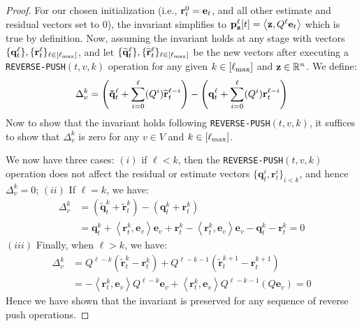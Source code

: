 \begin{proof}
For our chosen initialization (i.e., $\mathbf{r}^{0}_t = \mathbf{e}_t$, and all other estimate and residual vectors set to $0$), the invariant simplifies to $\mathbf{p}_\mathbf{z}^{\ell}[t] = \left< \mathbf{z} , Q^{\ell}\mathbf{e}_t \right>$ which is true by definition.
Now, assuming the invariant holds at any stage with vectors $\{\mathbf{q}^{\ell}_t\}, \{\mathbf{r}^{\ell}_t\}_{\ell\in[\ell_{\max}]}$, and let $\{\widetilde{\mathbf{q}}^{\ell}_t\}, \{\widetilde{\mathbf{r}}^{\ell}_t\}_{\ell\in[\ell_{\max}]}$ be the new vectors after executing a \texttt{REVERSE-PUSH}$(t,v,k)$ operation for any given $k\in[\ell_{\max}]$ and $\mathbf{z}\in\mathbb{R}^n$. We define:
$$\Delta_v^{k} = \left( \mathbf{\tilde{q}}_t^{\ell} + \sum_{i=0}^{\ell}  (Q^i)\widetilde{\mathbf{r}}^{\ell-i}_t \right)- \left( \mathbf{q}^{\ell}_t + \sum_{i=0}^{\ell}  (Q^i) \mathbf{r}_t^{\ell-i}\right)$$
Now to show that the invariant holds following \texttt{REVERSE-PUSH}$(t,v,k)$, it suffices to show that $\Delta_v^{k}$ is zero for any $v\in V$ and $k\in[\ell_{\max}]$. 

We now have three cases: $(i)$ if $\ell < k$, then the \texttt{REVERSE-PUSH}$(t,v,k)$ operation does not affect the residual or estimate vectors $\{\mathbf{q}_t^{i},\mathbf{r}_t^{i}\}_{i<k}$, and hence 
$\Delta_v^k=0$;
$(ii)$ If $\ell = k$, we have:
\begin{align*}
\Delta_v^{k} &= \left( \mathbf{\tilde{q}}_t^{k} +  \mathbf{\tilde{r}}_t^{k}\right)- \left( \mathbf{q}_t^{k} + \mathbf{r}_t^{k}\right)\\
&= \mathbf{q}_t^{k} + \left<\mathbf{r}_t^{k}, \mathbf{e}_v \right>\mathbf{e}_v +  \mathbf{r}_t^{k} - \left<\mathbf{r}_t^{k}, \mathbf{e}_v \right>\mathbf{e}_v - \mathbf{q}_t^{k} - \mathbf{r}_t^{k}
= 0
\end{align*}
$(iii)$ Finally, when $\ell > k$, we have: 
\begin{align*}
\Delta_v^k &= Q^{\ell-k}\left( \mathbf{\tilde{r}}_t^k - \mathbf{r}_t^k \right) + Q^{\ell-k-1}\left( \mathbf{\tilde{r}}_t^{k+1} - \mathbf{r}_t^{k+1} \right)\\
&= -\left<\mathbf{r}_t^k, \mathbf{e}_v \right>Q^{\ell-k}\mathbf{e}_v  + \left<\mathbf{r}_t^k, \mathbf{e}_v \right>Q^{\ell-k-1}\left(Q\mathbf{e}_v \right)
= 0
\end{align*}
Hence we have shown that the invariant is preserved for any sequence of reverse push operations.
\end{proof}

